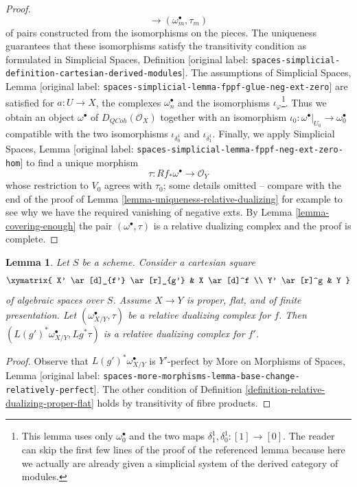 \documentclass[10pt,a4paper]{article}
\theoremstyle{plain}
\newtheorem{lemma}[subsection]{Lemma}
\theoremstyle{definition}
\theoremstyle{remark}
\numberwithin{equation}{subsection}
\def\QCoh{\mathit{QCoh}}
\begin{document}
\begin{proof}
$$\longrightarrow
(\omega_m^\bullet, \tau_m)
$$
of pairs constructed from the isomorphisms on the pieces.
The uniqueness guarantees that these isomorphisms satisfy
the transitivity condition as formulated in
Simplicial Spaces, Definition
\textnormal{[original label: \nolinkurl{spaces-simplicial-definition-cartesian-derived-modules}]}.
The assumptions of Simplicial Spaces, Lemma
\textnormal{[original label: \nolinkurl{spaces-simplicial-lemma-fppf-glue-neg-ext-zero}]}
are satisfied for $a : U \to X$, the complexes $\omega_n^\bullet$
and the isomorphisms $\iota_\varphi$\footnote{This lemma uses only
$\omega_0^\bullet$ and the two maps $\delta_1^1, \delta_0^1 : [1] \to [0]$.
The reader can skip the first few lines of the proof of the
referenced lemma
because here we actually are already given a simplicial system of
the derived category of modules.}.
Thus we obtain an object $\omega^\bullet$ of $D_\QCoh(\mathcal{O}_X)$
together with an isomorphism
$\iota_0 : \omega^\bullet|_{U_0} \to \omega_0^\bullet$
compatible with the two isomorphisms
$\iota_{\delta^1_0}$ and $\iota_{\delta^1_1}$.
Finally, we apply
Simplicial Spaces, Lemma
\textnormal{[original label: \nolinkurl{spaces-simplicial-lemma-fppf-neg-ext-zero-hom}]}
to find a unique morphism
$$
\tau : Rf_*\omega^\bullet \longrightarrow \mathcal{O}_Y
$$
whose restriction to $V_0$ agrees with $\tau_0$; some details omitted --
compare with the end of the  proof of
Lemma \ref{lemma-uniqueness-relative-dualizing}
for example to see why we have
the required vanishing of negative exts.
By Lemma \ref{lemma-covering-enough}
the pair $(\omega^\bullet, \tau)$ is a relative dualizing complex
and the proof is complete.
\end{proof}


\begin{lemma}
\label{lemma-base-change-relative-dualizing}
Let $S$ be a scheme. Consider a cartesian square
$$
\xymatrix{
X' \ar[d]_{f'} \ar[r]_{g'} & X \ar[d]^f \\
Y' \ar[r]^g & Y
}
$$
of algebraic spaces over $S$. Assume $X \to Y$ is proper, flat, and
of finite presentation. Let $(\omega_{X/Y}^\bullet, \tau)$ be a
relative dualizing complex for $f$. Then
$(L(g')^*\omega_{X/Y}^\bullet, Lg^*\tau)$ is a relative dualizing
complex for $f'$.
\end{lemma}

\begin{proof}
Observe that $L(g')^*\omega_{X/Y}^\bullet$ is $Y'$-perfect by
More on Morphisms of Spaces, Lemma
\textnormal{[original label: \nolinkurl{spaces-more-morphisms-lemma-base-change-relatively-perfect}]}.
The other condition of
Definition \ref{definition-relative-dualizing-proper-flat}
holds by transitivity of fibre products.
\end{proof}
\end{document}
